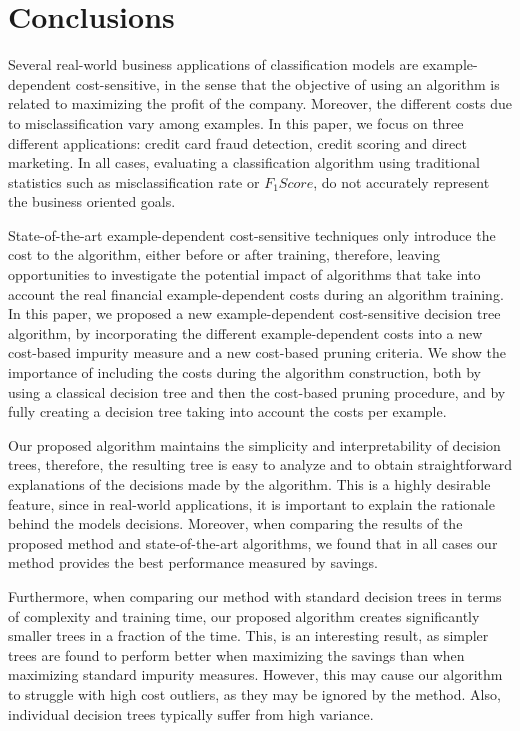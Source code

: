 \chapter{Conclusions}\label{ch:10}

Several real-world business applications of classification models are example-dependent 
cost-sensitive, in the sense that the objective of using an algorithm is related to maximizing the 
profit of the company. Moreover, the different costs due to misclassification vary among examples. 
In this paper, we focus on three different applications: credit card fraud detection, credit 
scoring 
and direct marketing. In all cases, evaluating a classification algorithm using traditional 
statistics such as misclassification rate or $F_1Score$, do not accurately represent the business 
oriented goals.

State-of-the-art example-dependent cost-sensitive techniques only introduce the cost to the 
algorithm, either before or after training, therefore, leaving opportunities to investigate
the potential impact of algorithms that take into account the real financial example-dependent 
costs during an algorithm training. In this paper, we proposed a new example-dependent 
cost-sensitive decision tree algorithm, by incorporating the different example-dependent costs into 
a new cost-based impurity measure and a new cost-based pruning criteria. We show the importance of 
including the costs during the algorithm construction, both by using a classical decision tree 
and then the cost-based pruning procedure, and by fully creating a decision tree taking into 
account 
the costs per example.

 Our proposed algorithm maintains the simplicity and interpretability of decision trees, 
therefore, the resulting tree is easy to analyze and to obtain straightforward explanations of 
the decisions made by the algorithm. This is a highly desirable feature, since in real-world 
applications, it is important to explain the rationale behind the models decisions.
Moreover, when comparing the results of the proposed method and state-of-the-art algorithms, 
we found that in all cases our method provides the best performance measured by savings.

Furthermore, when comparing our method with standard decision trees in terms of complexity 
and training time, our proposed algorithm creates significantly smaller trees in a fraction of the 
time. This, is an interesting result, as simpler trees are found to perform better when maximizing 
the savings than when maximizing standard impurity measures.
However, this may cause our algorithm to struggle with high cost outliers, as they may be ignored 
by the method. Also, individual decision trees typically suffer from high variance.

